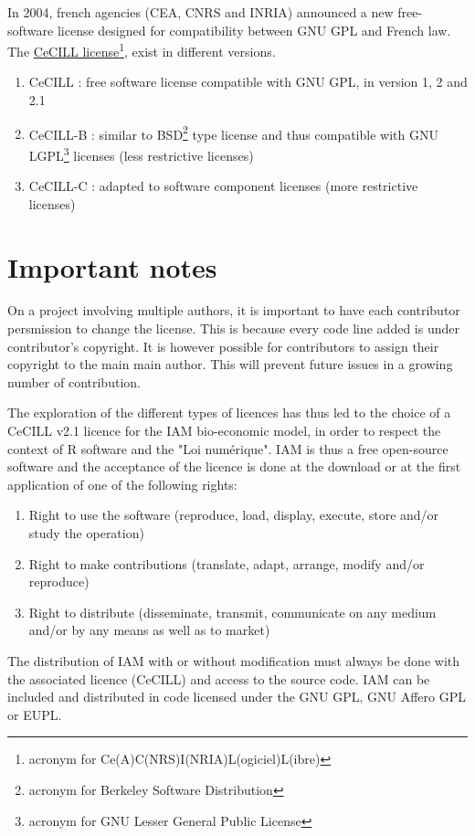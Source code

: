 \documentclass[12pt, colorinlistoftodos]{article}
\begin{document}
In 2004, french agencies (CEA, CNRS and INRIA) announced a new free-software license designed for compatibility between GNU GPL and French law.
The \href{https://cecill.info/index.fr.html}{CeCILL license}\footnote{acronym for Ce(A)C(NRS)I(NRIA)L(ogiciel)L(ibre)}, exist in different versions.

\begin{enumerate}
    \item CeCILL : free software license compatible with GNU GPL, in version 1, 2 and 2.1
    \item CeCILL-B : similar to BSD\footnote{acronym for Berkeley Software Distribution} type license and thus compatible with GNU LGPL\footnote{acronym for GNU Lesser General Public License} licenses (less restrictive licenses)
    \item CeCILL-C : adapted to software component licenses (more restrictive licenses)
\end{enumerate}

\section{Important notes}

On a project involving multiple authors, it is important to have each 
contributor persmission to change the license.
This is because every code line added is under contributor's copyright. 
It is however possible for contributors to assign their copyright to the main main author. 
This will prevent future issues in a growing number of contribution.

The exploration of the different types of licences has thus led to the choice of a CeCILL v2.1 licence for the IAM bio-economic model, 
in order to respect the context of R software and the "Loi numérique".
IAM is thus a free open-source software and the acceptance of the licence is done at the download or at the first application of one of the following rights:
\begin{enumerate}
    \item Right to use the software (reproduce, load, display, execute, store and/or study the operation)
    \item Right to make contributions (translate, adapt, arrange, modify and/or reproduce)
    \item Right to distribute (disseminate, transmit, communicate on any medium and/or by any means as well as to market)
\end{enumerate}
The distribution of IAM with or without modification must always be done with the associated licence (CeCILL) and access to the source code.
IAM can be included and distributed in code licensed under the GNU GPL, GNU Affero GPL or EUPL. 
\end{document}
